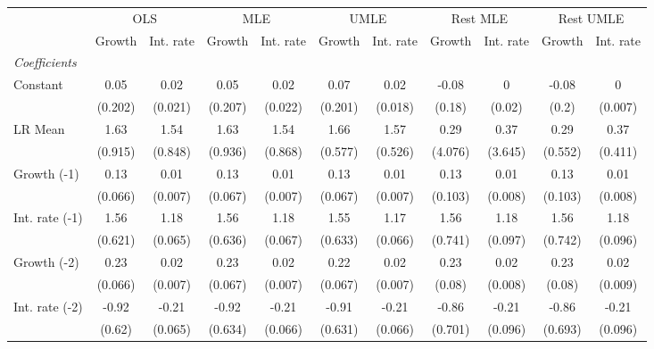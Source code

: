 \begin{table}[htbp] 
	\centering
	\begin{tabular}{@{\extracolsep{4pt}}lcccccccccc@{}}		\hline\hline
		 		 & \multicolumn{2}{c}{OLS} &\multicolumn{2}{c}{MLE} &\multicolumn{2}{c}{UMLE} &\multicolumn{2}{c}{Rest MLE} &\multicolumn{2}{c}{Rest UMLE} \\ 
 		 & Growth 	 & Int. rate 	 & Growth 	 & Int. rate 	 & Growth 	 & Int. rate 	 & Growth 	 & Int. rate 	 & Growth 	 & Int. rate\\\cline{2-3}\cline{4-5}\cline{6-7}\cline{8-9}\cline{10-11}
\rule{0pt}{4ex} 
 \emph{Coefficients} 	  		 & 		 & 		 & 		 & 		 & 		 & 		 & 		 & 		 & 		 &\\ 
\quad Constant 	 & 0.05 	 & 0.02 	 & 0.05 	 & 0.02 	 & 0.07 	 & 0.02 	 & -0.08 	 & 0 	 & -0.08 	 & 0	 \\ 
 		 & (0.202) 	 & (0.021) 	 & (0.207) 	 & (0.022) 	 & (0.201) 	 & (0.018) 	 & (0.18) 	 & (0.02) 	 & (0.2) 	 & (0.007) 	 \\ 
\quad LR Mean 	 & 1.63 	 & 1.54 	 & 1.63 	 & 1.54 	 & 1.66 	 & 1.57 	 & 0.29 	 & 0.37 	 & 0.29 	 & 0.37	 \\ 
 		 & (0.915) 	 & (0.848) 	 & (0.936) 	 & (0.868) 	 & (0.577) 	 & (0.526) 	 & (4.076) 	 & (3.645) 	 & (0.552) 	 & (0.411) 	 \\ 
\quad Growth (-1) 	 &0.13 	 & 0.01 	 & 0.13 	 & 0.01 	 & 0.13 	 & 0.01 	 & 0.13 	 & 0.01 	 & 0.13 	 & 0.01	 \\ 
 		 & (0.066) 	 & (0.007) 	 & (0.067) 	 & (0.007) 	 & (0.067) 	 & (0.007) 	 & (0.103) 	 & (0.008) 	 & (0.103) 	 & (0.008) 	 \\ 
\quad Int. rate (-1) 	 &1.56 	 & 1.18 	 & 1.56 	 & 1.18 	 & 1.55 	 & 1.17 	 & 1.56 	 & 1.18 	 & 1.56 	 & 1.18	 \\ 
 		 & (0.621) 	 & (0.065) 	 & (0.636) 	 & (0.067) 	 & (0.633) 	 & (0.066) 	 & (0.741) 	 & (0.097) 	 & (0.742) 	 & (0.096) 	 \\ 
\quad Growth (-2) 	 &0.23 	 & 0.02 	 & 0.23 	 & 0.02 	 & 0.22 	 & 0.02 	 & 0.23 	 & 0.02 	 & 0.23 	 & 0.02	 \\ 
 		 & (0.066) 	 & (0.007) 	 & (0.067) 	 & (0.007) 	 & (0.067) 	 & (0.007) 	 & (0.08) 	 & (0.008) 	 & (0.08) 	 & (0.009) 	 \\ 
\quad Int. rate (-2) 	 &-0.92 	 & -0.21 	 & -0.92 	 & -0.21 	 & -0.91 	 & -0.21 	 & -0.86 	 & -0.21 	 & -0.86 	 & -0.21	 \\ 
 		 & (0.62) 	 & (0.065) 	 & (0.634) 	 & (0.066) 	 & (0.631) 	 & (0.066) 	 & (0.701) 	 & (0.096) 	 & (0.693) 	 & (0.096) 	 \\ 

\end{tabular}
\end{table}
